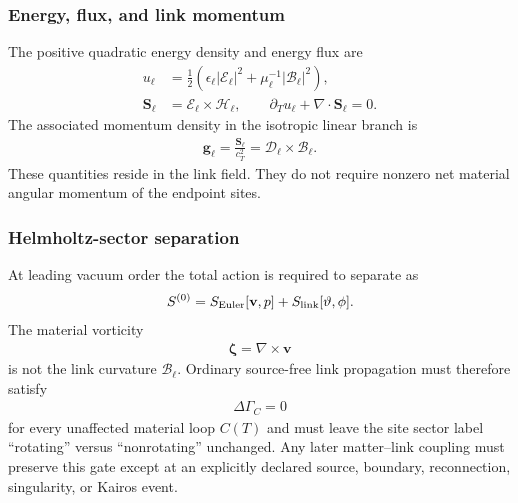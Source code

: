 \subsubsection{Energy, flux, and link momentum}

The positive quadratic energy density and energy flux are
\begin{align}
    u_\ell
    &=
    \frac12
    \left(
        \epsilon_\ell|\boldsymbol{\mathcal E}_\ell|^2
        +
        \mu_\ell^{-1}|\boldsymbol{\mathcal B}_\ell|^2
    \right),
    \\
    \mathbf S_\ell
    &=
    \boldsymbol{\mathcal E}_\ell
    \times
    \boldsymbol{\mathcal H}_\ell,
    \qquad
    \partial_Tu_\ell+\nabla\cdot\mathbf S_\ell=0.
    \label{eq:rt_link_energy_flux}
\end{align}
The associated momentum density in the isotropic linear branch is
\begin{align}
    \mathbf g_\ell
    =
    \frac{\mathbf S_\ell}{c_T^2}
    =
    \boldsymbol{\mathcal D}_\ell
    \times
    \boldsymbol{\mathcal B}_\ell.
    \label{eq:rt_link_momentum_density}
\end{align}
These quantities reside in the link field.  They do not require nonzero net
material angular momentum of the endpoint sites.

\subsubsection{Helmholtz-sector separation}

At leading vacuum order the total action is required to separate as
\begin{align}
    S^{(0)}
    =
    S_{\rm Euler}[\mathbf v,p]
    +
    S_{\rm link}[\vartheta,\phi].
    \label{eq:rt_link_euler_factorization}
\end{align}
The material vorticity
\begin{align}
    \boldsymbol\zeta=\nabla\times\mathbf v
\end{align}
is not the link curvature
$\boldsymbol{\mathcal B}_\ell$.  Ordinary source-free link propagation must
therefore satisfy
\begin{align}
    \Delta\Gamma_C=0
\end{align}
for every unaffected material loop $C(T)$ and must leave the site sector label
``rotating'' versus ``nonrotating'' unchanged.  Any later matter--link coupling
must preserve this gate except at an explicitly declared source, boundary,
reconnection, singularity, or Kairos event.

